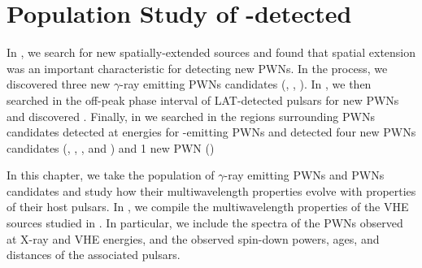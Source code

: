 \chapter{Population Study of -detected }


In , we search for new spatially-extended \fermi
sources and found that spatial extension was an important characteristic
for detecting new \acp{PWN}. In the process, we discovered three new
$\gamma$-ray emitting \acp{PWN} candidates (, ,
).  In , we then searched in the off-peak
phase interval of \ac{LAT}-detected pulsars for new \acp{PWN} and
discovered \threecfiftyeight.  Finally, in  we searched
in the regions surrounding \acp{PWN} candidates detected at \tev energies
for \gev-emitting \acp{PWN} and detected four new \acp{PWN} candidates
(, , , and ) and 1 new
PWN ()



In this chapter, we take the population of $\gamma$-ray
emitting \acp{PWN} and \acp{PWN} candidates and study how their
multiwavelength properties evolve with properties of their host pulsars.
In , we compile the multiwavelength
properties of the \ac{VHE} sources studied in . In
particular, we include the spectra of the \acp{PWN} observed at X-ray and \ac{VHE}
energies, and the observed spin-down powers, ages, and distances of the associated
pulsars.


